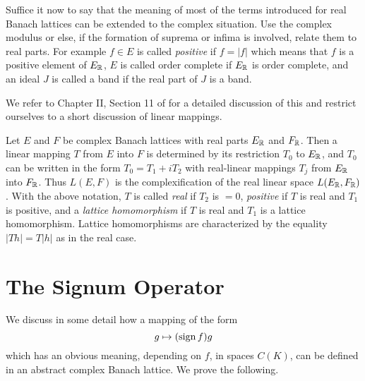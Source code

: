 Suffice it now to say that the meaning of most of the terms introduced for real Banach lattices can be extended to the complex situation.
Use the complex modulus or else, if the formation of suprema or infima is involved, relate them to real parts.
For example $ f \in E $ is called \emph{positive} if $ f = |f| $ which means that $ f $ is a positive element of $ E_{\mathbb{R}} $, $ E $ is called order complete if $ E_{\mathbb{R}} $ is order complete, and an ideal $ J $ is called a band if the real part of $ J $ is a band.

We refer to Chapter II, Section 11 of \citet{schaefer:1974} for a detailed discussion of this and restrict ourselves to a short discussion of linear mappings.

Let $ E $ and $ F $ be complex Banach lattices with real parts $ E_{\mathbb{R}} $ and $ F_{\mathbb{R}} $.
Then a linear mapping $ T $ from $ E $ into $ F $ is determined by its restriction $ T_{0} $ to $ E_{\mathbb{R}} $, and $ T_{0} $ can be written in the form $ T_{0} = T_{1} + iT_{2} $ with real-linear mappings $ T_{j} $ from $ E_{\mathbb{R}} $ into $ F_{\mathbb{R}} $.
Thus $ L(E,F) $ is the complexification of the real linear space $ L(E_{\mathbb{R}},F_{\mathbb{R}}) $.
With the above notation, $ T $ is called \emph{real} if $ T_{2} $ is $ = 0 $, \emph{positive} if $ T $ is real and $ T_{1} $ is positive, and a \emph{lattice homomorphism} if $ T $ is real and $ T_{1} $ is a lattice homomorphism.
Lattice homomorphisms are characterized by the equality $ |Th| = T|h| $ as in the real case.
\section{The Signum Operator}\label{sec:c1-8}%
We discuss in some detail how a mapping of the form
\[
g \mapsto (\operatorname{sign} f )g
\]
which has an obvious meaning, depending on $ f $, in spaces $ C(K) $, can be defined in an abstract complex Banach lattice.
We prove the following.

